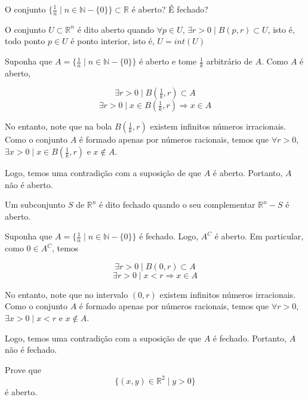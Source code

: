 \documentclass[../main.tex]{subfiles}
\begin{document}
		\begin{exercicio}{7}
			O conjunto $\{\tfrac{1}{n} \mid n \in \mathbb{N}-\{0\}\} \subset \mathbb{R}$ é aberto? É fechado?
		\end{exercicio}
		
		\begin{solucao}
			\begin{definicao}
				O conjunto $U\subset \mathbb{R}^{n}$ é dito aberto quando $\forall p\in U$, $\exists r>0\mid B(p,r)\subset U$, isto é, todo ponto $p\in U$ é ponto interior, isto é, $U=int(U)$
			\end{definicao}
			
			Suponha que $A=\{\tfrac{1}{n} \mid n \in \mathbb{N}-\{0\}\}$ é aberto e tome $\tfrac{1}{k}$ arbitrário de $A$. Como $A$ é aberto,
			
			\[
			\exists r>0\mid B(\tfrac{1}{k}, r)\subset A
			\]
			\[
			\exists r>0\mid x\in B(\tfrac{1}{k}, r) \Rightarrow x\in A
			\]
			
			No entanto, note que na bola $B(\tfrac{1}{k}, r)$ existem infinitos números irracionais. Como o conjunto $A$ é formado apenas por números racionais, temos que $\forall r>0$, $\exists x>0\mid x\in B(\tfrac{1}{k},r)$ e $x\notin A$.
			
			Logo, temos uma contradição com a suposição de que $A$ é aberto. Portanto, $A$ não é aberto.
			
			\begin{definicao}
				Um subconjunto $S$ de $\mathbb{R}^n$ é dito fechado quando o seu complementar $\mathbb{R}^{n}-S$ é aberto.
			\end{definicao}
			
			Suponha que $A=\{\tfrac{1}{n} \mid n \in \mathbb{N}-\{0\}\}$ é fechado. Logo, $A^C$ é aberto. Em particular, como $0\in A^C$, temos
			
			\[
			\exists r>0\mid B(0,r)\subset A
			\]
			\[
			\exists r>0\mid x<r\Rightarrow x\in A
			\]
			
			No entanto, note que no intervalo $(0,r)$ existem infinitos números irracionais. Como o conjunto $A$ é formado apenas por números racionais, temos que $\forall r>0$, $\exists x>0\mid x<r$ e $x\notin A$.
			
			Logo, temos uma contradição com a suposição de que $A$ é fechado. Portanto, $A$ não é fechado.
		\end{solucao}
		
		\begin{exercicio}{9}
			Prove que
			\[
			\{(x, y)\in \mathbb{R}^2\mid y > 0\}
			\]
			é aberto.
		\end{exercicio}
		
\end{document}
